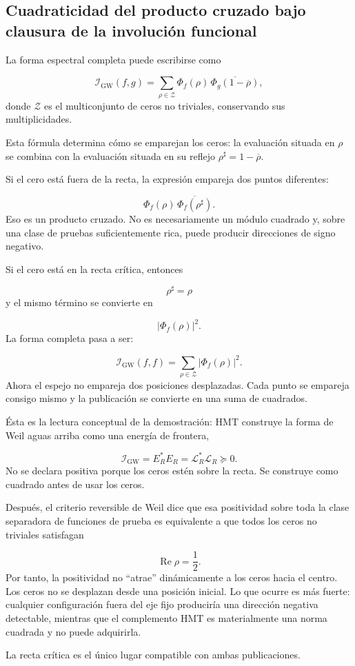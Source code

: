 \subsection{Cuadraticidad del producto cruzado bajo clausura de la involución funcional}
La forma espectral completa puede escribirse como\par
\[
\mathscr I_{\mathrm{GW}}(f,g)
=
\sum_{\rho\in\mathscr Z}
\Phi_f(\rho)\,
\overline{\Phi_g(1-\overline\rho)},
\]
donde \(\mathscr Z\) es el multiconjunto de ceros no triviales, conservando sus multiplicidades.\par
Esta fórmula determina cómo se emparejan los ceros: la evaluación situada en \(\rho\) se combina con la evaluación situada en su reflejo \(\rho^\sharp=1-\overline\rho\).\par
Si el cero está fuera de la recta, la expresión empareja dos puntos diferentes:\par
\[
\Phi_f(\rho)\,
\overline{\Phi_f(\rho^\sharp)}.
\]
Eso es un producto cruzado. No es necesariamente un módulo cuadrado y, sobre una clase de pruebas suficientemente rica, puede producir direcciones de signo negativo.\par
Si el cero está en la recta crítica, entonces\par
\[
\rho^\sharp=\rho
\]
y el mismo término se convierte en\par
\[
|\Phi_f(\rho)|^2.
\]
La forma completa pasa a ser:\par
\[
\mathscr I_{\mathrm{GW}}(f,f)
=
\sum_{\rho\in\mathscr Z}
|\Phi_f(\rho)|^2.
\]
Ahora el espejo no empareja dos posiciones desplazadas. Cada punto se empareja consigo mismo y la publicación se convierte en una suma de cuadrados.\par
Ésta es la lectura conceptual de la demostración: HMT construye la forma de Weil aguas arriba como una energía de frontera,\par
\[
\mathscr I_{\mathrm{GW}}
=
E_R^*E_R
=
\mathscr L_R^*\mathscr L_R
\succeq0.
\]
No se declara positiva porque los ceros estén sobre la recta. Se construye como cuadrado antes de usar los ceros.\par
Después, el criterio reversible de Weil dice que esa positividad sobre toda la clase separadora de funciones de prueba es equivalente a que todos los ceros no triviales satisfagan\par
\[
\operatorname{Re}\rho=\frac12.
\]
Por tanto, la positividad no “atrae” dinámicamente a los ceros hacia el centro. Los ceros no se desplazan desde una posición inicial. Lo que ocurre es más fuerte: cualquier configuración fuera del eje fijo produciría una dirección negativa detectable, mientras que el complemento HMT es materialmente una norma cuadrada y no puede adquirirla.\par
La recta crítica es el único lugar compatible con ambas publicaciones.\par
{}
